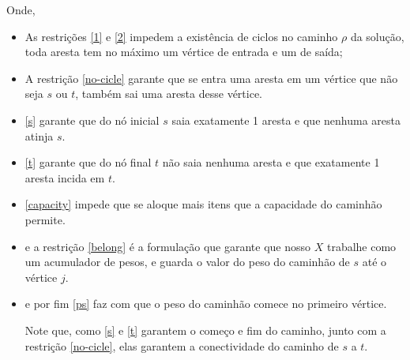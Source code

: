 \documentclass[conference]{IEEEtran}
\begin{document}
    Onde,

    \begin{itemize}
        \item As restrições \ref{1} e \ref{2} impedem a existência de ciclos no caminho $\rho$ da solução, toda aresta tem no máximo um vértice de entrada e um de saída;

        \item A restrição \ref{no-cicle} garante que se entra uma aresta em um vértice que não seja $s$ ou $t$, também sai uma aresta desse vértice.

        \item \ref{s} garante que do nó inicial $s$ saia  exatamente 1 aresta e que nenhuma aresta atinja  $s$.
        \item \ref{t} garante que do nó final $t$ não saia nenhuma aresta e que exatamente 1 aresta incida em $t$.

        \item \ref{capacity} impede que se aloque mais itens que a capacidade do caminhão permite.

        \item e a restrição \ref{belong} é a formulação que garante que nosso $X$ trabalhe como um acumulador de pesos, e guarda o valor do peso do caminhão de $s$ até o vértice $j$.

        \item e por fim \ref{ps} faz com que o peso do caminhão comece no primeiro vértice.

    Note que, como \ref{s} e \ref{t} garantem o começo e fim do caminho, junto com a restrição \ref{no-cicle}, elas garantem a conectividade do caminho de $s$ a $t$.

    \end{itemize}
\end{document}
